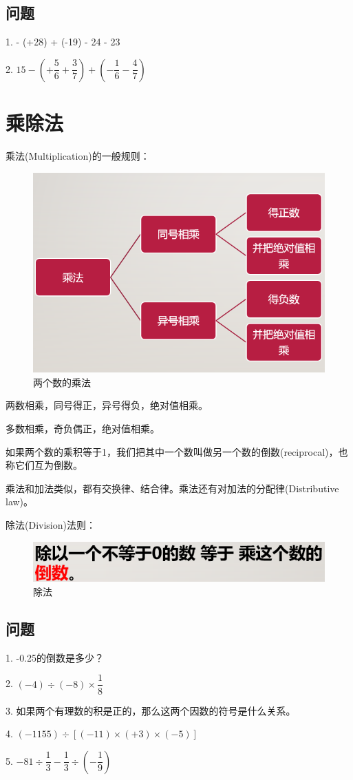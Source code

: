 \documentclass[UTF8,12pt]{ctexart}
\begin{document}
\subsection{问题}
1.  - (+28) + (-19) - 24 - 23

2. \quad $ 15 - (+\dfrac{5}{6}+\dfrac{3}{7}) + (-\dfrac{1}{6}-\dfrac{4}{7}) $

\newpage
\section{乘除法}
乘法(Multiplication)的一般规则：

\begin{figure}[htb]
\centering
\includegraphics[width = .75\textwidth]{multiplication.png}
\caption{两个数的乘法}
\label{fig:multiplication}
\end{figure}

两数相乘，同号得正，异号得负，绝对值相乘。

多数相乘，奇负偶正，绝对值相乘。

如果两个数的乘积等于1，我们把其中一个数叫做另一个数的倒数(reciprocal)，也称它们互为倒数。

乘法和加法类似，都有交换律、结合律。乘法还有对加法的分配律(Distributive law)。

\newpage
除法(Division)法则：
\begin{figure}[htb]
\centering
\includegraphics[width = .5\textwidth]{division.png}
\caption{除法}
\label{fig:division}
\end{figure}

\subsection{问题}
1. \quad -0.25的倒数是多少？

2. \quad $ (-4)\div(-8)\times\dfrac{1}{8} $

3. \quad 如果两个有理数的积是正的，那么这两个因数的符号是什么关系。

4. \quad $ (-1155) \div [(-11) \times (+3) \times (-5)] $

5. \quad $ -81 \div \dfrac{1}{3} - \dfrac{1}{3} \div (-\dfrac{1}{9}) $
\end{document}
